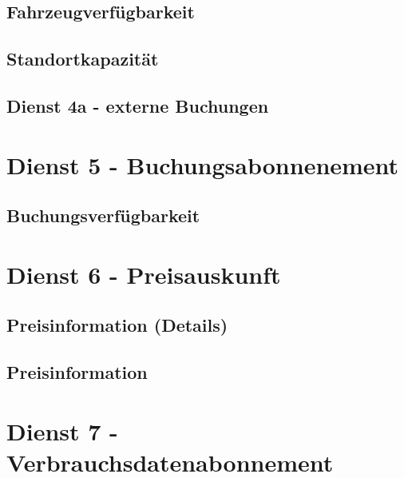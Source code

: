 \subsection*{Fahrzeugverfügbarkeit}



\subsection*{Standortkapazität}



\subsection*{Dienst 4a - externe Buchungen}
\label{sec:Datenmodell:Dienst4a}



\section{Dienst 5 - Buchungsabonnenement}
\label{sec:Datenmodell:Dienst5}

\subsection*{Buchungsverfügbarkeit}



\section{Dienst 6 - Preisauskunft}
\label{sec:Datenmodell:Dienst6}

\subsection*{Preisinformation (Details)}



\subsection*{Preisinformation}




\section{Dienst 7 - Verbrauchsdatenabonnement}
\label{sec:Datenmodell:Dienst7}

